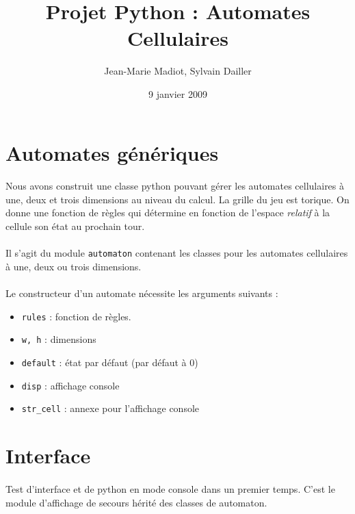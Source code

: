 \documentclass[a4paper]{article}
\title{Projet Python : Automates Cellulaires}
\author{Jean-Marie Madiot, Sylvain Dailler}
\date{9 janvier 2009}
\begin{document}
\maketitle{}

\section{Automates génériques}

\paragraph{} Nous avons construit une classe python pouvant gérer les automates cellulaires à une, deux et trois dimensions au niveau du calcul. La grille du jeu est torique. On donne une fonction de règles qui détermine en fonction de l'espace \textit{relatif} à la cellule son état au prochain tour.

\paragraph{} Il s'agit du module {\tt automaton} contenant les classes pour les automates cellulaires à une, deux ou trois dimensions.

\paragraph{} Le constructeur d'un automate nécessite les arguments suivants :

\begin{itemize}
\item{{\tt rules} : fonction de règles.}
\item{{\tt w, h} : dimensions}
\item{{\tt default} : état par défaut (par défaut à 0)}
\item{{\tt disp} : affichage console}
\item{{\tt str\_cell} : annexe pour l'affichage console}
\end{itemize}

\section{Interface}

\paragraph{} Test d'interface et de python en mode console dans un premier temps. C'est le module d'affichage de secours hérité des classes de automaton.
\end{document}
